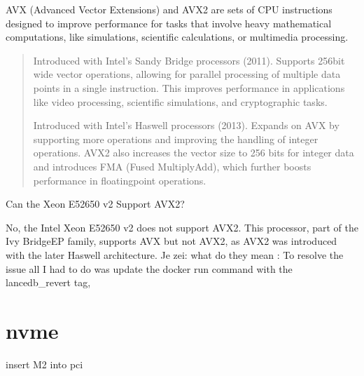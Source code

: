 \documentclass[letterpaper,10pt,english]{sphinxmanual}
\begin{document}
\sphinxAtStartPar
AVX (Advanced Vector Extensions) and AVX2 are sets of CPU instructions designed to improve performance for tasks that involve heavy mathematical computations, like simulations, scientific calculations, or multimedia processing.
\begin{quote}
\begin{description}
\sphinxAtStartPar
Introduced with Intel’s Sandy Bridge processors (2011).
Supports 256\sphinxhyphen{}bit wide vector operations, allowing for parallel processing of multiple data points in a single instruction. This improves performance in applications like video processing, scientific simulations, and cryptographic tasks.

\sphinxAtStartPar
Introduced with Intel’s Haswell processors (2013).
Expands on AVX by supporting more operations and improving the handling of integer operations. AVX2 also increases the vector size to 256 bits for integer data and introduces FMA (Fused Multiply\sphinxhyphen{}Add), which further boosts performance in floating\sphinxhyphen{}point operations.

\end{description}
\end{quote}

\sphinxAtStartPar
Can the Xeon E5\sphinxhyphen{}2650 v2 Support AVX2?

\sphinxAtStartPar
No, the Intel Xeon E5\sphinxhyphen{}2650 v2 does not support AVX2. This processor, part of the Ivy Bridge\sphinxhyphen{}EP family, supports AVX but not AVX2, as AVX2 was introduced with the later Haswell architecture.
Je zei:
what do they mean : To resolve the issue all I had to do was update the docker run command with the lancedb\_revert tag,

\sphinxstepscope


\chapter{nvme}
\label{\detokenize{nvme:nvme}}\label{\detokenize{nvme::doc}}
\sphinxAtStartPar
insert M2 into pci
\end{document}
